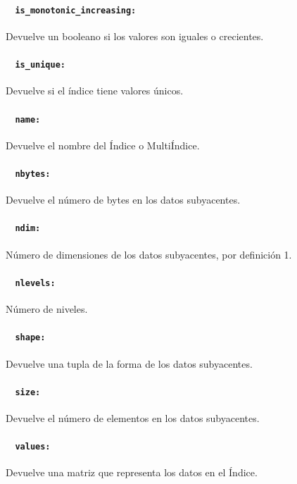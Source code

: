 \paragraph{~\hspace{2em} \texttt{is\_monotonic\_increasing:}} Devuelve un
booleano si los valores son iguales o crecientes.
\paragraph{~\hspace{2em} \texttt{is\_unique:}} Devuelve si el índice tiene
valores únicos.
\paragraph{~\hspace{2em} \texttt{name:}} Devuelve el nombre del Índice o
MultiÍndice.
\paragraph{~\hspace{2em} \texttt{nbytes:}} Devuelve el número de bytes en los
datos subyacentes.
\paragraph{~\hspace{2em} \texttt{ndim:}} Número de dimensiones de los datos
subyacentes, por definición 1.
\paragraph{~\hspace{2em} \texttt{nlevels:}} Número de niveles.
\paragraph{~\hspace{2em} \texttt{shape:}} Devuelve una tupla de la forma de los
datos subyacentes.
\paragraph{~\hspace{2em} \texttt{size:}} Devuelve el número de elementos en los
datos subyacentes.
\paragraph{~\hspace{2em} \texttt{values:}} Devuelve una matriz que representa
los datos en el Índice.

